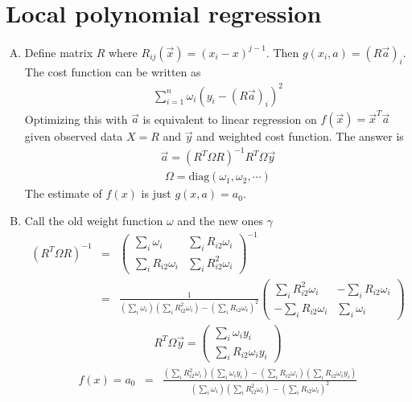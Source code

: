 \documentclass{article}
\begin{document}
\section{Local polynomial regression}
\begin{enumerate}[(A)]
\item
Define matrix $R$ where $R_{ij}(\vec{x})=(x_i-x)^{j-1}$. Then $g(x_i,a)=(R\vec{a})_i$. The cost function can be written as
\begin{eqnarray}
\sum_{i=1}^n\omega_i(y_i-(R\vec{a})_i)^2
\end{eqnarray}
Optimizing this with $\vec{a}$ is equivalent to linear regression on $f(\vec{x})=\vec{x}^T\vec{a}$ given observed data $X=R$ and $\vec{y}$ and weighted cost function. The answer is
\begin{eqnarray}
\vec{a}=(R^T\Omega R)^{-1}R^T\Omega\vec{y}
\end{eqnarray}
\begin{eqnarray}
\Omega=\textrm{diag}(\omega_1,\omega_2,\cdots)
\end{eqnarray}
The estimate of $f(x)$ is just $g(x,a)=a_0$.
\item
Call the old weight function $\omega$ and the new ones $\gamma$
\begin{eqnarray}
(R^T\Omega R)^{-1}&=&\left( \begin{array}{cc}
\sum_i\omega_i & \sum_iR_{i2}\omega_i \\
\sum_iR_{i2}\omega_i & \sum_i R_{i2}^2\omega_i  \end{array} \right)^{-1}\nonumber\\
&=&\frac{1}{(\sum_i\omega_i)( \sum_i R_{i2}^2\omega_i )-(\sum_iR_{i2}\omega_i)^2 }\left( \begin{array}{cc}
\sum_i R_{i2}^2\omega_i & -\sum_iR_{i2}\omega_i \\
-\sum_iR_{i2}\omega_i & \sum_i\omega_i  \end{array} \right)
\end{eqnarray}
\begin{eqnarray}
R^T\Omega\vec{y}=\left( \begin{array}{c}
\sum_i\omega_iy_i \\
\sum_iR_{i2}\omega_iy_i \end{array} \right)
\end{eqnarray}
\begin{eqnarray}
f(x)=a_0&=&\frac{(\sum_i R_{i2}^2\omega_i)(\sum_i\omega_iy_i)-(\sum_iR_{i2}\omega_i)(\sum_iR_{i2}\omega_iy_i)}{(\sum_i\omega_i)( \sum_i R_{i2}^2\omega_i )-(\sum_iR_{i2}\omega_i)^2 }\nonumber\\

\end{eqnarray}
\end{enumerate}
\end{document}
